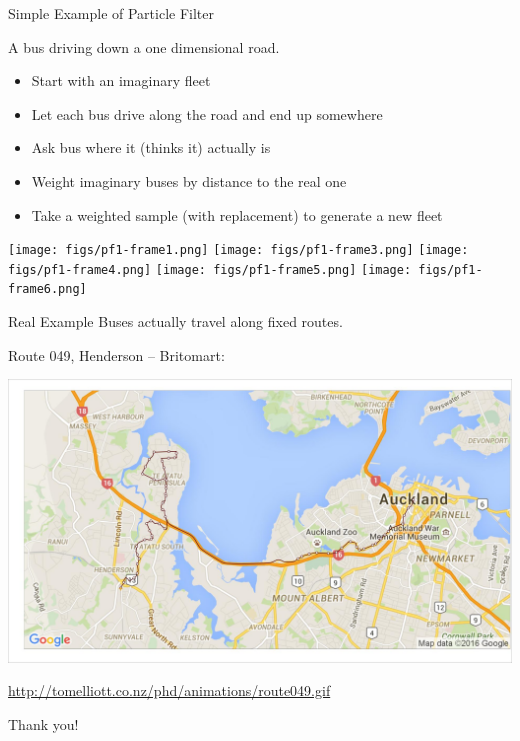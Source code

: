 \documentclass[10pt,t]{beamer}
\begin{document}
\begin{frame}{Simple Example of Particle Filter}

  A bus driving down a one dimensional road.
  \onslide<+->

  \begin{itemize}[<+- | alert@+>]
  \item Start with an imaginary fleet
  \item Let each bus drive along the road and end up somewhere
  \item Ask bus where it (thinks it) actually is
  \item Weight imaginary buses by distance to the real one
  \item Take a weighted sample (with replacement) to generate a new fleet
  \end{itemize}
  
  \begin{overprint}
    \centering
    \texttt{[image: figs/pf1-frame1.png]}
    \centering
    \texttt{[image: figs/pf1-frame3.png]}
    \centering
    \texttt{[image: figs/pf1-frame4.png]}
    \centering
    \texttt{[image: figs/pf1-frame5.png]}
    \centering
    \texttt{[image: figs/pf1-frame6.png]}
  \end{overprint}

  \onslide<+->
\end{frame}


\begin{frame}{Real Example}
  Buses actually travel along fixed routes.
  
  Route 049, Henderson -- Britomart:
  
  {\centering
  \includegraphics[width=\textwidth]{pf/particle_map001.jpg}}

  \footnotesize\url{http://tomelliott.co.nz/phd/animations/route049.gif}

\end{frame}


\begin{frame}[standout]
  Thank you!
\end{frame}
\end{document}
